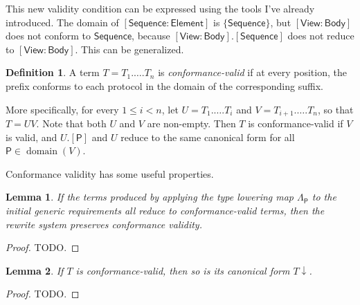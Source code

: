\documentclass[headsepline,bibliography=totoc]{scrreport}
\newcommand{\namesym}[1]{\mathsf{#1}}
\newcommand{\proto}[1]{\bm{\mathsf{#1}}}
\newcommand{\protosym}[1]{[\proto{#1}]}
\newcommand{\assocsym}[2]{[\proto{#1}\colon\namesym{#2}]}
\DeclareMathOperator{\domain}{domain}
\newtheorem{lemma}{Lemma}[chapter]
\theoremstyle{definition}
\theoremstyle{definition}
\newtheorem{definition}{Definition}[chapter]
\theoremstyle{definition}
\begin{document}
This new validity condition can be expressed using the tools I've already introduced. The domain of $\assocsym{Sequence}{Element}$ is $\{\proto{Sequence}\}$, but $\assocsym{View}{Body}$ does not conform to $\proto{Sequence}$, because $\assocsym{View}{Body}.\protosym{Sequence}$ does not reduce to $\assocsym{View}{Body}$. This can be generalized.
\begin{definition} A term $T=T_1.\ldots.T_n$ is \emph{conformance-valid} if at every position, the prefix conforms to each protocol in the domain of the corresponding suffix.

More specifically, for every $1\leq i<n$, let $U=T_1.\ldots.T_i$ and $V=T_{i+1}.\ldots.T_n$, so that $T=UV$. Note that both $U$ and $V$ are non-empty. Then $T$ is conformance-valid if $V$ is valid, and $U.\protosym{P}$ and $U$ reduce to the same canonical form for all $\proto{P}\in\domain(V)$.
\end{definition}
Conformance validity has some useful properties.
\begin{lemma} If the terms produced by applying the type lowering map $\Lambda_{\proto{P}}$ to the initial generic requirements all reduce to conformance-valid terms, then the rewrite system preserves conformance validity.
\end{lemma}
\begin{proof} TODO.
\end{proof}

\begin{lemma} If $T$ is conformance-valid, then so is its canonical form ${T}{\downarrow}$.
\end{lemma}
\begin{proof} TODO.
\end{proof}

\iffalse
This solves the quandry presented at the beginning of this chapter, where the earlier formulation of the rewrite system that lacked associated type symbols had no apparent way of implementing the \texttt{getCanonicalTypeInContext()} generic signature query.

Now that a term containing name symbols reduces to a canonical term with associated type symbols, it appears that mapping terms back to fully resolved type parameters is now a possibility. Unfortunately, the reality is a little bit more complicated. The inherited associated type construction I will introduce in the next section once again breaks the correspondence between terms and canonical types; this will be repaired in Section \ref{implqueries}.
\fi
\end{document}
